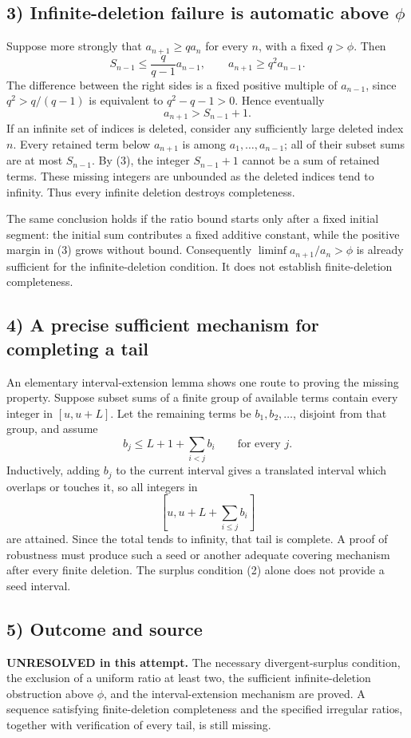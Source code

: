 \subsection*{3) Infinite-deletion failure is automatic above $\phi$}
Suppose more strongly that $a_{n+1}\ge q a_n$ for every $n$, with a fixed $q>\phi$. Then
\[S_{n-1}\le\frac{q}{q-1}a_{n-1},\qquad a_{n+1}\ge q^2a_{n-1}.
\]
The difference between the right sides is a fixed positive multiple of $a_{n-1}$, since $q^2>q/(q-1)$ is equivalent to $q^2-q-1>0$. Hence eventually
\[a_{n+1}>S_{n-1}+1.\tag{3}\]
If an infinite set of indices is deleted, consider any sufficiently large deleted index $n$. Every retained term below $a_{n+1}$ is among $a_1,\ldots,a_{n-1}$; all of their subset sums are at most $S_{n-1}$. By (3), the integer $S_{n-1}+1$ cannot be a sum of retained terms. These missing integers are unbounded as the deleted indices tend to infinity. Thus every infinite deletion destroys completeness.

The same conclusion holds if the ratio bound starts only after a fixed initial segment: the initial sum contributes a fixed additive constant, while the positive margin in (3) grows without bound. Consequently $\liminf a_{n+1}/a_n>\phi$ is already sufficient for the infinite-deletion condition. It does not establish finite-deletion completeness.

\subsection*{4) A precise sufficient mechanism for completing a tail}
An elementary interval-extension lemma shows one route to proving the missing property. Suppose subset sums of a finite group of available terms contain every integer in $[u,u+L]$. Let the remaining terms be $b_1,b_2,\ldots$, disjoint from that group, and assume
\[b_j\le L+1+\sum_{i<j}b_i\qquad\text{for every }j.
\]
Inductively, adding $b_j$ to the current interval gives a translated interval which overlaps or touches it, so all integers in
\[\left[u,u+L+\sum_{i\le j}b_i\right]
\]
are attained. Since the total tends to infinity, that tail is complete. A proof of robustness must produce such a seed or another adequate covering mechanism after every finite deletion. The surplus condition (2) alone does not provide a seed interval.

\subsection*{5) Outcome and source}
\textbf{UNRESOLVED in this attempt.} The necessary divergent-surplus condition, the exclusion of a uniform ratio at least two, the sufficient infinite-deletion obstruction above $\phi$, and the interval-extension mechanism are proved. A sequence satisfying finite-deletion completeness and the specified irregular ratios, together with verification of every tail, is still missing.

